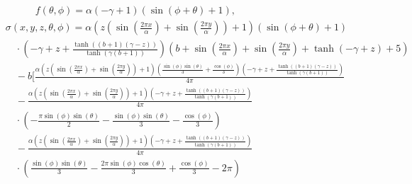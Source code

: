 \documentclass[ms,cpyr,lof,lot]{uathesis}
\providecommand{\DIFaddbegin}{} %
\providecommand{\DIFaddend}{} %
\providecommand{\DIFdelbegin}{} %
\providecommand{\DIFdelend}{} %
\newcommand{\DIFscaledelfig}{0.5}
\newlength{\DIFdelgraphicswidth} %
\newlength{\DIFdelgraphicsheight} %
\newcommand{\DIFaddincludegraphics}[2][]{{\color{blue}\fbox{\DIFOincludegraphics[#1]{#2}}}} %
\newcommand{\DIFdelincludegraphics}[2][]{%
\sbox{\DIFdelgraphicsbox}{\DIFOincludegraphics[#1]{#2}}%
\settoboxwidth{\DIFdelgraphicswidth}{\DIFdelgraphicsbox} %
\settoboxtotalheight{\DIFdelgraphicsheight}{\DIFdelgraphicsbox} %
\scalebox{\DIFscaledelfig}{%
\parbox[b]{\DIFdelgraphicswidth}{\usebox{\DIFdelgraphicsbox}\\[-\baselineskip] \rule{\DIFdelgraphicswidth}{0em}}\llap{\resizebox{\DIFdelgraphicswidth}{\DIFdelgraphicsheight}{%
\setlength{\unitlength}{\DIFdelgraphicswidth}%
\begin{picture}(1,1)%
\thicklines\linethickness{2pt} %
{\color[rgb]{1,0,0}\put(0,0){\framebox(1,1){}}}%
{\color[rgb]{1,0,0}\put(0,0){\line( 1,1){1}}}%
{\color[rgb]{1,0,0}\put(0,1){\line(1,-1){1}}}%
\end{picture}%
}\hspace*{3pt}}} %
} %
\DeclareRobustCommand{\DIFaddbegin}{\DIFOaddbegin \let\includegraphics\DIFaddincludegraphics} %
\DeclareRobustCommand{\DIFaddend}{\DIFOaddend \let\includegraphics\DIFOincludegraphics} %
\DeclareRobustCommand{\DIFdelbegin}{\DIFOdelbegin \let\includegraphics\DIFdelincludegraphics} %
\DeclareRobustCommand{\DIFdelend}{\DIFOaddend \let\includegraphics\DIFOincludegraphics} %
\begin{document}
\begin{align}
  &\quad\qquad f(\theta, \phi) = \alpha \left(- \gamma + 1\right) \left(\sin{\left (\phi + \theta \right )} + 1\right),
  \DIFdelbegin %
\DIFdelend \DIFaddbegin \label{eqn:mms_bc_expr} \DIFaddend \\
  &\sigma(x, y, z, \theta, \phi) = \alpha \left(z \left(\sin{\left (\frac{2 \pi x}{\alpha} \right )} + \sin{\left (\frac{2 \pi y}{\alpha} \right )}\right) + 1\right) \left(\sin{\left (\phi + \theta \right )} + 1\right) \nonumber\\
  &\quad \cdot \left(- \gamma + z + \frac{\tanh{\left (\left(b + 1\right) \left(\gamma - z\right) \right )}}{\tanh{\left (\gamma \left(b + 1\right) \right )}}\right) \left(b + \sin{\left (\frac{2 \pi x}{\alpha} \right )} + \sin{\left (\frac{2 \pi y}{\alpha} \right )} + \tanh{\left (- \gamma + z \right )} + 5\right) \nonumber\\
  &\quad - b \Bigg[ \frac{\alpha \left(z \left(\sin{\left (\frac{2 \pi x}{\alpha} \right )} + \sin{\left (\frac{2 \pi y}{\alpha} \right )}\right) + 1\right) \left(\frac{\sin{\left (\phi \right )} \sin{\left (\theta \right )}}{3} + \frac{\cos{\left (\phi \right )}}{3}\right) \left(- \gamma + z + \frac{\tanh{\left (\left(b + 1\right) \left(\gamma - z\right) \right )}}{\tanh{\left (\gamma \left(b + 1\right) \right )}}\right)}{4 \pi} \nonumber\\
  &\quad - \frac{\alpha \left(z \left(\sin{\left (\frac{2 \pi x}{\alpha} \right )} + \sin{\left (\frac{2 \pi y}{\alpha} \right )}\right) + 1\right) \left(- \gamma + z + \frac{\tanh{\left (\left(b + 1\right) \left(\gamma - z\right) \right )}}{\tanh{\left (\gamma \left(b + 1\right) \right )}}\right)}{4 \pi} \nonumber\\
    &\quad \cdot \left(-\frac{\pi \sin{\left( \phi \right)}\sin{\left( \theta \right)}}{2} - \frac{\sin{\left (\phi \right )} \sin{\left (\theta \right )}}{3} - \frac{\cos{\left (\phi \right )}}{3}\right) \nonumber\\
  &\quad - \frac{\alpha \left(z \left(\sin{\left (\frac{2 \pi x}{\alpha} \right )} + \sin{\left (\frac{2 \pi y}{\alpha} \right )}\right) + 1\right) \left(- \gamma + z + \frac{\tanh{\left (\left(b + 1\right) \left(\gamma - z\right) \right )}}{\tanh{\left (\gamma \left(b + 1\right) \right )}}\right)}{4 \pi} \nonumber\\
    &\quad \cdot \left(\frac{\sin{\left( \phi \right)}\sin{\left( \theta \right)}}{3} - \frac{2 \pi \sin{\left (\phi \right )} \cos{\left (\theta \right )}}{3} + \frac{\cos{\left (\phi \right )}}{3} - 2 \pi\right) \nonumber\\

\end{align}
\end{document}
